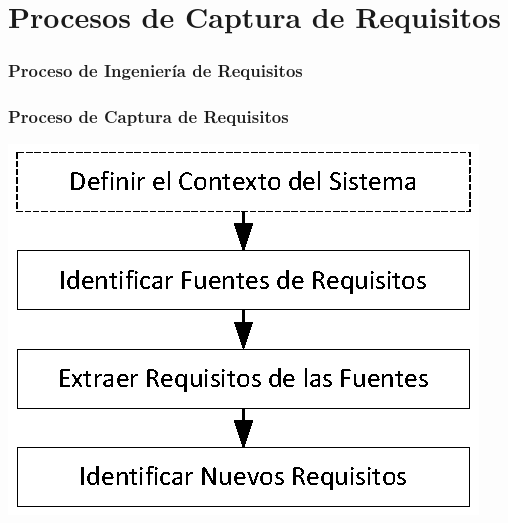 ﻿\documentclass[handout,a4paper,slidestop,xcolor=pst,dvips,blue]{beamer}
\begin{document}
\section{Procesos de Captura de Requisitos}

\begin{frame}
    \frametitle{Proceso de Ingeniería de Requisitos}
\end{frame}

\begin{frame}
    \frametitle{Proceso de Captura de Requisitos}
    \begin{center}
        \includegraphics[width=0.75\linewidth]{images/introduction/procesoCaptura.eps}
    \end{center}
\end{frame}
\end{document}

